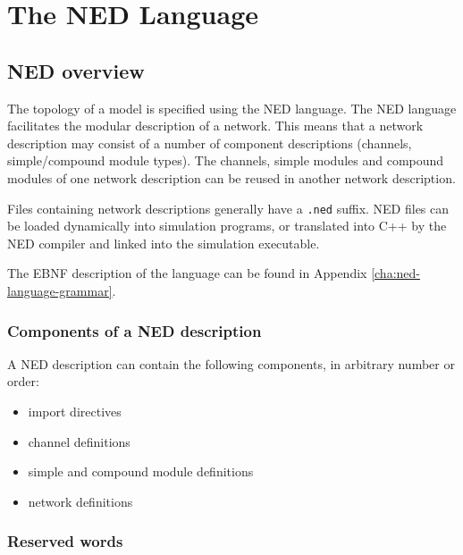 \chapter{The NED Language}
\label{cha:the-ned-language}


\section{NED overview}

The topology of a model is specified using
the NED language.
The NED language facilitates the modular description of a network.
This means that a network description may consist
of a number of component descriptions (channels,
simple/compound module
types). The channels, simple modules and compound
modules of one network description can be reused in another network
description.

Files containing network descriptions generally have a \texttt{.ned}
suffix. NED files can be loaded dynamically into simulation programs,
or translated into C++ by the NED compiler and linked into
the simulation executable.

The EBNF description of the language can be found in Appendix
\ref{cha:ned-language-grammar}.


\subsection{Components of a NED description}

A NED description can contain the following components, in arbitrary
number or order:
\begin{itemize}
  \item{import directives}
  \item{channel definitions}
  \item{simple and compound module definitions}
  \item{network definitions}
\end{itemize}


\subsection{Reserved words}

